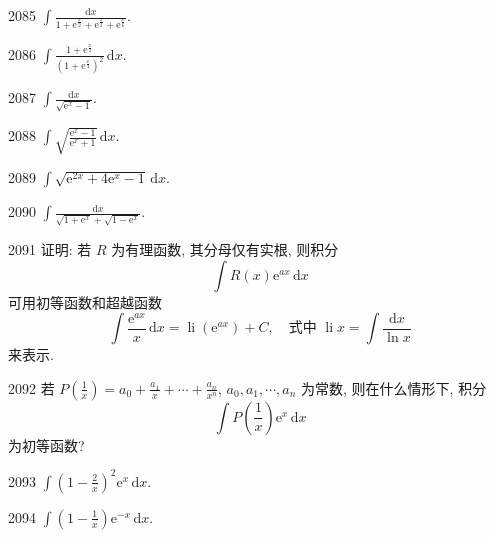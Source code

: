 \begin{prob}[S]{2085}
$\int \frac{\mathrm{d}x}{1 + \mathrm{e}^{\frac{x}{2}} + \mathrm{e}^{\frac{x}{3}} + \mathrm{e}^{\frac{x}{6}}}$.
\end{prob}

\begin{prob}[S]{2086}
$\int \frac{1 + \mathrm{e}^{\frac{x}{2}}}{\left(1 + \mathrm{e}^{\frac{x}{4}}\right)^2}\,\mathrm{d}x$.
\end{prob}

\begin{prob}[S]{2087}
$\int \frac{\mathrm{d}x}{\sqrt{\mathrm{e}^x - 1}}$.
\end{prob}

\begin{prob}[S]{2088}
$\int \sqrt{\frac{\mathrm{e}^x - 1}{\mathrm{e}^x + 1}} \,\mathrm{d}x$.
\end{prob}

\begin{prob}[S]{2089}
$\int \sqrt{\mathrm{e}^{2x} + 4\mathrm{e}^x - 1} \,\mathrm{d}x$.
\end{prob}

\begin{prob}[S]{2090}
$\int \frac{\mathrm{d}x}{\sqrt{1 + \mathrm{e}^x} + \sqrt{1 - \mathrm{e}^x}}$.
\end{prob}

\begin{prob}[M]{2091}
证明: 若 $R$ 为有理函数, 其分母仅有实根, 则积分
\[
\int R(x)\mathrm{e}^{ax} \,\mathrm{d}x
\]
可用初等函数和超越函数
\[
\int \frac{\mathrm{e}^{ax}}{x} \,\mathrm{d}x = \operatorname{li}(\mathrm{e}^{ax}) + C, \quad \text{式中 } \operatorname{li} x = \int \frac{\mathrm{d}x}{\ln x}
\]
来表示.
\end{prob}

\begin{prob}[M]{2092}
若 $P\left(\frac{1}{x}\right) = a_0 + \frac{a_1}{x} + \cdots + \frac{a_n}{x^n}$, $a_0, a_1, \cdots, a_n$ 为常数, 则在什么情形下, 积分
\[
\int P\left(\frac{1}{x}\right) \mathrm{e}^x \,\mathrm{d}x
\]
为初等函数?
\end{prob}


\begin{prob}[S]{2093}
$\int \left(1 - \frac{2}{x}\right)^2 \mathrm{e}^x \,\mathrm{d}x$.
\end{prob}

\begin{prob}[S]{2094}
$\int \left(1 - \frac{1}{x}\right) \mathrm{e}^{-x} \,\mathrm{d}x$.
\end{prob}

